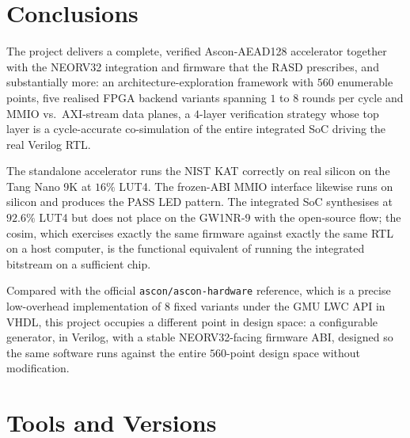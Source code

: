 \documentclass[11pt,a4paper]{article}
\begin{document}
\section{Conclusions}

The project delivers a complete, verified Ascon-AEAD128 accelerator
together with the NEORV32 integration and firmware that the RASD
prescribes, and substantially more: an architecture-exploration
framework with $560$ enumerable points, five realised FPGA backend
variants spanning $1$ to $8$ rounds per cycle and MMIO vs.\ AXI-stream
data planes, a $4$-layer verification strategy whose top layer is a
cycle-accurate co-simulation of the entire integrated SoC driving the
real Verilog RTL.

The standalone accelerator runs the NIST KAT correctly on real silicon
on the Tang Nano 9K at $16\%$ LUT4. The frozen-ABI MMIO interface
likewise runs on silicon and produces the PASS LED pattern. The
integrated SoC synthesises at $92.6\%$ LUT4 but does not place on the
GW1NR-9 with the open-source flow; the cosim, which exercises exactly
the same firmware against exactly the same RTL on a host computer, is
the functional equivalent of running the integrated bitstream on a
sufficient chip.

Compared with the official \texttt{ascon/ascon-hardware} reference,
which is a precise low-overhead implementation of $8$ fixed variants
under the GMU LWC API in VHDL, this project occupies a different point
in design space: a configurable generator, in Verilog, with a stable
NEORV32-facing firmware ABI, designed so the same software runs against
the entire $560$-point design space without modification.

\appendix

\section{Tools and Versions}
\end{document}
